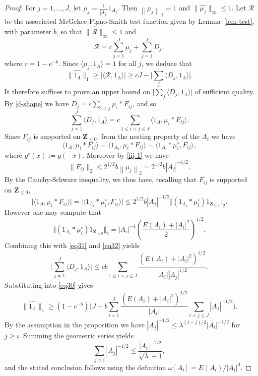 \documentclass[reqno]{amsart}
\newcommand{\anorm}[1]{\| \widehat{#1}\|}
\renewcommand{\leq}{\leqslant}
\renewcommand{\geq}{\geqslant}
\newcommand{\ri}{\mathcal{R}}
\newcommand{\ind}[1]{1_{#1}}
\newcommand{\bbz}{\mathbf{Z}}
\newcommand{\abs}[1]{\left\lvert #1\right\rvert}
\newcommand{\brac}[1]{\left( #1\right)}
\newcommand{\norm}[1]{\left\lVert #1\right\rVert}
\numberwithin{equation}{section}
\theoremstyle{definition}
\theoremstyle{remark}
\begin{document}
\begin{proof}
For $j = 1,\dots, J$, let $\mu_j=\frac{1}{\abs{A_j}}\ind{A_j}$. Then $\norm{\mu_j}_1=1$ and $\| \widehat{\mu_j}\|_\infty \leq 1$. Let $\ri$ be the associated McGehee-Pigno-Smith test function given by Lemma~\ref{lem-test}, with parameter $b$, so that $\| \widehat{\ri}\|_\infty \leq 1$ and
\[\ri=c\sum_{j = 1}^J \mu_{j}+\sum_{j = 1}^J D_j,\]
where $c=1-e^{-b}$. Since $\langle \mu_j,\ind{A}\rangle=1$ for all $j$, we deduce that
\begin{equation}\label{eq30} \anorm{\ind{A}}_1\geq \abs{\langle \ri,1_A\rangle}\geq cJ - \Big| \sum_j\langle D_j,\ind{A}\rangle \Big|.\end{equation}
It therefore suffices to prove an upper bound on $\big| \sum_j\langle D_j,\ind{A}\rangle\big|$ of sufficient quality. By \eqref{d-shape} we have $D_j=c\sum_{i<j}\mu_i\ast F_{ij}$,
and so 
\begin{equation}\label{eq31} \sum_{j = 1}^J \langle D_j,\ind{A}\rangle=c\sum_{1 \leq i<j \leq J}\langle 1_{A},\mu_i\ast F_{ij}\rangle.\end{equation}
Since $F_{ij}$ is supported on $\bbz_{\leq 0}$, from the nesting property of the $A_i$ we have 
\[ \langle 1_{A},\mu_i\ast F_{ij}\rangle = \langle 1_{A_{i}},\mu_i\ast F_{ij}\rangle = \langle 1_{A_i} \ast \mu_i^{\circ}, F_{ij}\rangle,\] where $g^{\circ}(x) := \overline{g(-x)}$.
Moreover by \eqref{fij-1} we have 
\[\| F_{ij}\|_2\leq 2^{1/2}b\norm{\mu_j}_2=2^{1/2}b\abs{A_j}^{-1/2}.\]
By the Cauchy-Schwarz inequality, we thus have, recalling that $F_{ij}$ is supported on $\bbz_{\leq 0}$,
\begin{equation}\label{eq32} \big| \langle 1_{A},\mu_i\ast F_{ij}\rangle\big| = \big| \langle 1_{A_{i}} \ast \mu_i^{\circ} , F_{ij}\rangle\big|  \leq 2^{1/2} b |A_j|^{-1/2} \big\Vert (1_{A_{i}} \ast \mu_i^{\circ})1_{\bbz_{\leq 0}} \big\Vert_2.\end{equation}
However one may compute that 
\[ \Vert (1_{A_{i}} \ast \mu_i^{\circ})1_{\bbz_{\leq 0}}\Vert_2 = \abs{A_i}^{-1}\brac{\frac{E(A_i)+\abs{A_i}^2}{2}}^{1/2}.\]
Combining this with \eqref{eq31} and \eqref{eq32} yields
\[ \Big| \sum_{j = 1}^J \langle D_j, 1_A\rangle \Big| \leq c b \sum_{1 \leq i < j \leq J}\frac{(E(A_i)+\abs{A_i}^2)^{1/2}}{|A_i| |A_j|^{1/2}}.\]
Substituting into \eqref{eq30} gives
\[\anorm{1_A}_1\geq (1-e^{-b})\Big( J-b\sum_{i = 1}^J\frac{(E(A_i)+\abs{A_i}^2)^{1/2}}{\abs{A_i}}\sum_{i<j\leq J}\abs{A_j}^{-1/2}\Big).\]
By the assumption in the proposition we have $|A_{j}|^{-1/2} \leq \lambda^{(i - j)/2} |A_i|^{-1/2}$ for $j \geq i$. Summing the geometric series yields
\[ \sum_{j > i} |A_j|^{-1/2} \leq \frac{\abs{A_i}^{-1/2}}{\sqrt{\lambda} - 1},\] and the stated conclusion follows using the definition $\omega[A_i] = E(A_i)/|A_i|^3$.
\end{proof}
\end{document}
